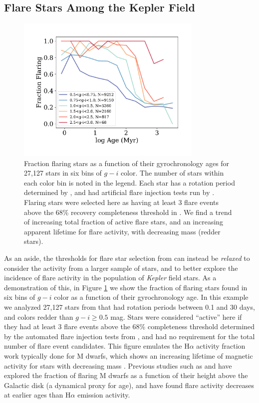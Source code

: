 \documentclass[preprint2]{aastex62}
\newcommand{\Kepler}{\textsl{Kepler}\xspace}
\begin{document}
\subsection{Flare Stars Among the Kepler Field}

\begin{figure}[!ht]
\centering
\includegraphics[width=3.5in]{fig2}
\caption{
Fraction flaring stars as a function of their gyrochronology ages for 27,127 stars in six bins of $g-i$ color. The number of stars within each color bin is noted in the legend.
Each star has a rotation period determined by \citet{mcquillan2014}, and had artificial flare injection tests run by \citet{davenport2016}. Flaring stars were selected here as having at least 3 flare events above the 68\% recovery completeness threshold in \citet{davenport2016}. We find a trend of increasing total fraction of active flare stars, and an increasing apparent lifetime for flare activity, with decreasing mass (redder stars).
}
\label{fig:fracactive}
\end{figure}


As an aside, the thresholds for flare star selection from \citet{davenport2016} can instead be {\it relaxed} to consider the activity from a larger sample of stars, and to better explore the incidence of flare activity in the population of \Kepler field stars. As a demonstration of this, in Figure \ref{fig:fracactive} we show the fraction of flaring stars found in six bins of $g-i$ color as a function of their gyrochronology age. In this example we analyzed 27,127 stars from \citet{mcquillan2014} that had rotation periods between 0.1 and 30 days, and colors redder than $g-i \ge 0.5$ mag. Stars were considered ``active'' here if they had at least 3 flare events above the 68\% completeness threshold determined by the automated flare injection tests from \citet{davenport2016}, and had no requirement for the total number of flare event candidates. This figure emulates the H$\alpha$ activity fraction work typically done for M dwarfs, which shows an increasing lifetime of magnetic activity for stars with decreasing mass \citep[e.g.][]{west2008}. Previous studies such as \citet{kowalski2009} and \citet{hilton2010} have explored the fraction of flaring M dwarfs as a function of their height above the Galactic disk (a dynamical proxy for age), and have found flare activity decreases at earlier ages than H$\alpha$ emission activity. 
\end{document}
